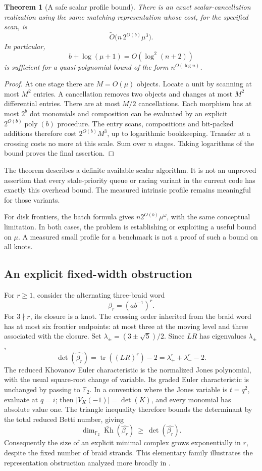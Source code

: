 \documentclass[11pt,letterpaper]{article}
\newtheorem{theorem}{Theorem}[section]
\theoremstyle{definition}
\newcommand{\F}{\mathbb F_2}
\newcommand{\tr}{\operatorname{tr}}
\newcommand{\Kh}{\operatorname{Kh}}
\newcommand{\softO}{\widetilde O}
\begin{document}
\begin{theorem}[A safe scalar profile bound]
\label{thm:profile}
There is an exact scalar-cancellation realization using the same matching
representation whose cost, for the specified scan, is
\[
          \softO\bigl(n\,2^{O(b)}\mu^3\bigr).
\]
In particular,
\[
                   b+\log(\mu+1)=O(\log^2(n+2))
\]
is sufficient for a quasi-polynomial bound of the form
\(n^{O(\log n)}\).
\end{theorem}
\begin{proof}
At one stage there are \(M=O(\mu)\) objects. Locate a unit by scanning
at most \(M^2\) entries. A cancellation removes two objects and changes
at most \(M^2\) differential entries. There are at most \(M/2\)
cancellations. Each morphism has at most \(2^b\) dot monomials and
composition can be evaluated by an explicit \(2^{O(b)}\operatorname{poly}(b)\)
procedure. The entry scans, compositions and bit-packed additions
therefore cost \(2^{O(b)}M^3\), up to logarithmic bookkeeping.
Transfer at a crossing costs no more at this scale.
Sum over \(n\) stages.
Taking logarithms of the bound proves the final assertion.
\end{proof}

The theorem describes a definite available scalar algorithm.
It is not an unproved assertion that every stale-priority queue or
racing variant in the current code has exactly this overhead bound.
The measured intrinsic profile remains meaningful for those variants.

For disk frontiers, the batch formula gives
\(n2^{O(b)}\mu^\omega\), with the same conceptual limitation.
In both cases, the problem is establishing or exploiting a useful
bound on \(\mu\). A measured small profile for a benchmark is not a proof
of such a bound on all knots.

\subsection{An explicit fixed-width obstruction}

For \(r\ge1\), consider the alternating three-braid word
\[
                  \beta_r=(ab^{-1})^r.
\]
For \(3\nmid r\), its closure is a knot. The crossing order inherited
from the braid word has at most six frontier endpoints: at most three at
the moving level and three associated with the closure.
Set \(\lambda_\pm=(3\pm\sqrt5)/2\).
Since \(LR\) has eigenvalues \(\lambda_\pm\),
\[
 \det(\widehat{\beta_r})
 =\tr((LR)^r)-2
 =\lambda_+^r+\lambda_-^r-2.
\]
The reduced Khovanov Euler characteristic is the normalized Jones
polynomial, with the usual square-root change of variable. Its graded
Euler characteristic is unchanged by passing to \(\F\). In a convention
where the Jones variable is \(t=q^2\), evaluate at \(q=i\); then
\(|V_K(-1)|=\det(K)\), and every monomial has absolute value one.
The triangle inequality therefore bounds the determinant by the total
reduced Betti number, giving
\[
 \dim_{\F}\widetilde{\Kh}(\widehat{\beta_r})
       \ \ge\ \det(\widehat{\beta_r}).
\]
Consequently the size of an explicit minimal complex grows exponentially
in \(r\), despite the fixed number of braid strands.
This elementary family illustrates the representation obstruction
analyzed more broadly in \cite{kelomaki2026}.
\end{document}
